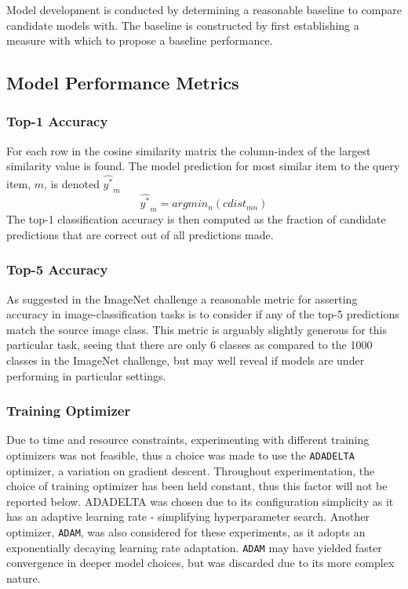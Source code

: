 Model development is conducted by determining a reasonable baseline to compare candidate models with. 
The baseline is constructed by first establishing a measure with which to propose a baseline performance. 

\subsection{Model Performance Metrics}\label{sec:MPM}
\subsubsection{Top-1 Accuracy}
For each row in the cosine similarity matrix the column-index of the largest similarity value is found. 
The model prediction for most similar item to the query item, $m$, is denoted $\widehat{y^{*}}_{m}$
$$
\widehat{y^{*}}_{m} = argmin_{n}(cdist_{mn})
$$
The top-1 classification accuracy is then computed as the fraction of candidate predictions that are correct out of all predictions made.

\subsubsection{Top-5 Accuracy}
As suggested in the ImageNet challenge\autocite{ILSVRC15} a reasonable metric for asserting accuracy in image-classification tasks is to consider if any of the top-5 predictions match the source image class.
This metric is arguably slightly generous for this particular task, seeing that there are only 6 classes as compared to the 1000 classes in the ImageNet challenge, but may well reveal if models are under performing in particular settings.

\subsubsection{Training Optimizer}\label{hellosec}
Due to time and resource constraints, experimenting with different training optimizers was not feasible, thus a choice was made to use the \texttt{ADADELTA}\autocite{Zeiler2012} optimizer, a variation on gradient descent.
Throughout experimentation, the choice of training optimizer has been held constant, thus this factor will not be reported below.
ADADELTA was chosen due to its configuration simplicity as it has an adaptive learning rate - simplifying hyperparameter search.
Another optimizer, \texttt{ADAM}, was also considered for these experiments, as it adopts an exponentially decaying learning rate adaptation. 
\texttt{ADAM} may have yielded faster convergence in deeper model choices\autocite{Kingma2015}, but was discarded due to its more complex nature.

